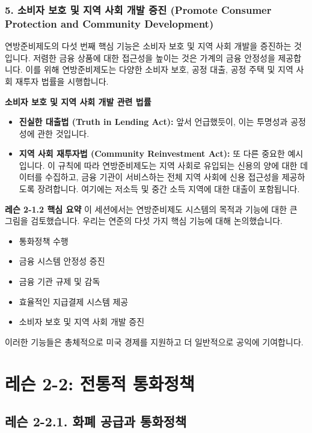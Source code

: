 \documentclass[11pt,a4paper]{article}
\theoremstyle{definition}
\begin{document}
\subsubsection*{5. 소비자 보호 및 지역 사회 개발 증진 (Promote Consumer Protection and Community Development)}
연방준비제도의 다섯 번째 핵심 기능은 소비자 보호 및 지역 사회 개발을 증진하는 것입니다. 저렴한 금융 상품에 대한 접근성을 높이는 것은 가계의 금융 안정성을 제공합니다. 이를 위해 연방준비제도는 다양한 소비자 보호, 공정 대출, 공정 주택 및 지역 사회 재투자 법률을 시행합니다.

\begin{examplebox}
\textbf{소비자 보호 및 지역 사회 개발 관련 법률}
\begin{itemize}
    \item \textbf{진실한 대출법 (Truth in Lending Act):} 앞서 언급했듯이, 이는 투명성과 공정성에 관한 것입니다.
    \item \textbf{지역 사회 재투자법 (Community Reinvestment Act):} 또 다른 중요한 예시입니다. 이 규칙에 따라 연방준비제도는 지역 사회로 유입되는 신용의 양에 대한 데이터를 수집하고, 금융 기관이 서비스하는 전체 지역 사회에 신용 접근성을 제공하도록 장려합니다. 여기에는 저소득 및 중간 소득 지역에 대한 대출이 포함됩니다.
\end{itemize}
\end{examplebox}

\begin{summarybox}
\textbf{레슨 2-1.2 핵심 요약}
이 세션에서는 연방준비제도 시스템의 목적과 기능에 대한 큰 그림을 검토했습니다. 우리는 연준의 다섯 가지 핵심 기능에 대해 논의했습니다.
\begin{itemize}
    \item 통화정책 수행
    \item 금융 시스템 안정성 증진
    \item 금융 기관 규제 및 감독
    \item 효율적인 지급결제 시스템 제공
    \item 소비자 보호 및 지역 사회 개발 증진
\end{itemize}
이러한 기능들은 총체적으로 미국 경제를 지원하고 더 일반적으로 공익에 기여합니다.
\end{summarybox}

\newpage
\section{레슨 2-2: 전통적 통화정책}

\subsection{레슨 2-2.1. 화폐 공급과 통화정책}
\end{document}
